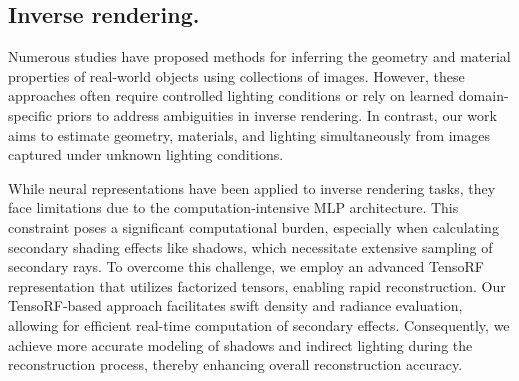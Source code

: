 \begin{survey}
\section{Inverse rendering.} Numerous studies \cite{d3c, xdd, svb} have proposed methods for inferring the geometry and material properties of real-world objects using collections of images. However, these approaches often require controlled lighting conditions or rely on learned domain-specific priors to address ambiguities in inverse rendering. In contrast, our work aims to estimate geometry, materials, and lighting simultaneously from images captured under unknown lighting conditions.

While neural representations have been applied to inverse rendering tasks, they face limitations due to the computation-intensive MLP architecture. This constraint poses a significant computational burden, especially when calculating secondary shading effects like shadows, which necessitate extensive sampling of secondary rays. To overcome this challenge, we employ an advanced TensoRF \cite{tensorf} representation that utilizes factorized tensors, enabling rapid reconstruction. Our TensoRF-based approach facilitates swift density and radiance evaluation, allowing for efficient real-time computation of secondary effects. Consequently, we achieve more accurate modeling of shadows and indirect lighting during the reconstruction process, thereby enhancing overall reconstruction accuracy.


% 

\printbibliography

\end{survey}
